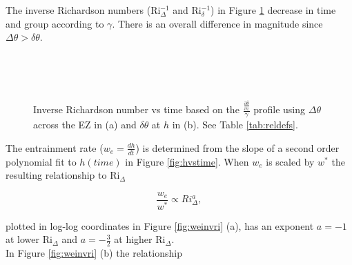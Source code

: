 The inverse Richardson numbers (\acs{Ri}$_{\Delta}^{-1}$ and \acs{Ri}$_{\delta}^{-1}$) in Figure \ref{fig:invristime} decrease in time and group according to $\gamma$. There is an overall difference in magnitude since $\Delta \theta > \delta \theta$.\\  

\begin{figure}[htbp]

\begin{minipage}[b]{0.5\linewidth}
         
        \\
        \end{minipage}             
\quad
\begin{minipage}[b]{0.5\linewidth}
        \\
       
       \end{minipage}
        \caption[Richardson Numbers based on $\frac{\frac{\partial \overline{\theta}}{\partial z}}{\gamma}$]{Inverse Richardson number vs time based on the $\frac{\frac{\partial \overline{\theta}}{\partial z}}{\gamma}$
profile using $\Delta \theta$ across the \acs{EZ} in (a) and $\delta \theta$ at $h$ in (b).  See Table \ref{tab:reldefs}.}
        \label{fig:invristime}
\end{figure}

The entrainment rate ($w_{e}= \frac{dh}{dt}$) is determined from the slope of a second order polynomial fit to $h(time)$ in Figure \ref{fig:hvstime}.  When $w_{e}$ is scaled by $w^{*}$ the resulting relationship to \acs{Ri}$_{\Delta}$  

\begin{equation}
\frac{w_{e}}{w^{*}} \propto Ri_{\Delta}^{a},
\end{equation}

plotted in log-log coordinates in Figure \ref{fig:weinvri} (a), has an exponent $a = -1$ at lower \acs{Ri}$_{\Delta}$ and $a = -\frac{3}{2}$ at higher \acs{Ri}$_{\Delta}$.\\

In Figure \ref{fig:weinvri} (b) the relationship

